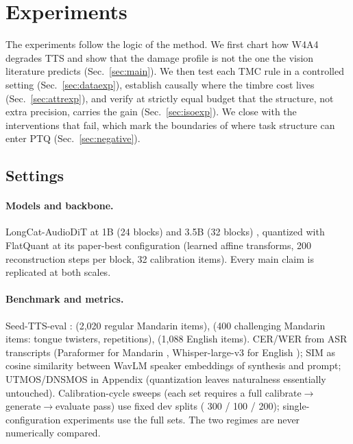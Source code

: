 \section{Experiments}
\label{sec:exp}

The experiments follow the logic of the method. We first chart how W4A4 degrades TTS and show that the damage profile is not the one the vision literature predicts (Sec.~\ref{sec:main}). We then test each TMC rule in a controlled setting (Sec.~\ref{sec:dataexp}), establish causally where the timbre cost lives (Sec.~\ref{sec:attrexp}), and verify at strictly equal budget that the structure, not extra precision, carries the gain (Sec.~\ref{sec:isoexp}). We close with the interventions that fail, which mark the boundaries of where task structure can enter PTQ (Sec.~\ref{sec:negative}).

\subsection{Settings}
\label{sec:settings}

\paragraph{Models and backbone.}
LongCat-AudioDiT at 1B (24 blocks) and 3.5B (32 blocks) \citep{xin2026longcat}, quantized with FlatQuant at its paper-best configuration (learned affine transforms, 200 reconstruction steps per block, 32 calibration items). Every main claim is replicated at both scales.

\paragraph{Benchmark and metrics.}
Seed-TTS-eval \citep{seedttseval}: \zh{} (2{,}020 regular Mandarin items), \hard{} (400 challenging Mandarin items: tongue twisters, repetitions), \en{} (1{,}088 English items). CER/WER from ASR transcripts (Paraformer for Mandarin \citep{gao2022paraformer}, Whisper-large-v3 for English \citep{radford2023whisper}); SIM as cosine similarity between WavLM speaker embeddings \citep{chen2022wavlm} of synthesis and prompt; UTMOS/DNSMOS in Appendix (quantization leaves naturalness essentially untouched). Calibration-cycle sweeps (each set requires a full calibrate$\to$generate$\to$evaluate pass) use fixed dev splits (\zh{} 300 / \hard{} 100 / \en{} 200); single-configuration experiments use the full sets. The two regimes are never numerically compared.

